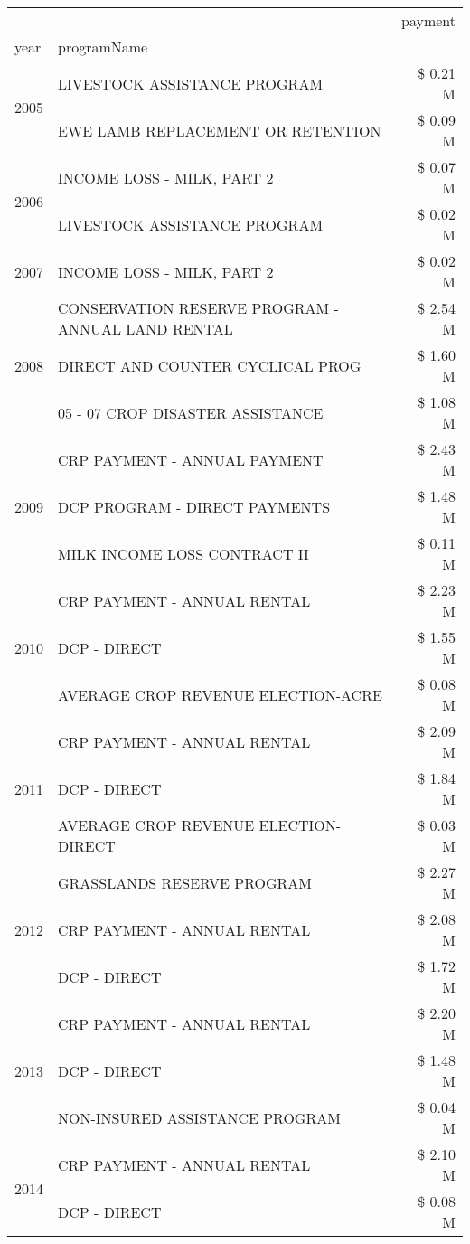 \begin{tabular}{llr}
\toprule
 &  & payment \\
year & programName &  \\
\midrule
\multirow[t]{2}{*}{2005} & LIVESTOCK ASSISTANCE PROGRAM & \$ 0.21 M \\
 & EWE LAMB REPLACEMENT OR RETENTION & \$ 0.09 M \\
\cline{1-3}
\multirow[t]{2}{*}{2006} & INCOME LOSS - MILK, PART 2 & \$ 0.07 M \\
 & LIVESTOCK ASSISTANCE PROGRAM & \$ 0.02 M \\
\cline{1-3}
2007 & INCOME LOSS - MILK, PART 2 & \$ 0.02 M \\
\cline{1-3}
\multirow[t]{3}{*}{2008} & CONSERVATION RESERVE PROGRAM - ANNUAL LAND RENTAL & \$ 2.54 M \\
 & DIRECT AND COUNTER CYCLICAL PROG & \$ 1.60 M \\
 & 05 - 07 CROP DISASTER ASSISTANCE & \$ 1.08 M \\
\cline{1-3}
\multirow[t]{3}{*}{2009} & CRP PAYMENT - ANNUAL PAYMENT & \$ 2.43 M \\
 & DCP PROGRAM - DIRECT PAYMENTS & \$ 1.48 M \\
 & MILK INCOME LOSS CONTRACT II & \$ 0.11 M \\
\cline{1-3}
\multirow[t]{3}{*}{2010} & CRP PAYMENT - ANNUAL RENTAL & \$ 2.23 M \\
 & DCP - DIRECT & \$ 1.55 M \\
 & AVERAGE CROP REVENUE ELECTION-ACRE & \$ 0.08 M \\
\cline{1-3}
\multirow[t]{3}{*}{2011} & CRP PAYMENT - ANNUAL RENTAL & \$ 2.09 M \\
 & DCP - DIRECT & \$ 1.84 M \\
 & AVERAGE CROP REVENUE ELECTION-DIRECT & \$ 0.03 M \\
\cline{1-3}
\multirow[t]{3}{*}{2012} & GRASSLANDS RESERVE PROGRAM & \$ 2.27 M \\
 & CRP PAYMENT - ANNUAL RENTAL & \$ 2.08 M \\
 & DCP - DIRECT & \$ 1.72 M \\
\cline{1-3}
\multirow[t]{3}{*}{2013} & CRP PAYMENT - ANNUAL RENTAL & \$ 2.20 M \\
 & DCP - DIRECT & \$ 1.48 M \\
 & NON-INSURED ASSISTANCE PROGRAM & \$ 0.04 M \\
\cline{1-3}
\multirow[t]{3}{*}{2014} & CRP PAYMENT - ANNUAL RENTAL & \$ 2.10 M \\
 & DCP - DIRECT & \$ 0.08 M \\

\end{tabular}
